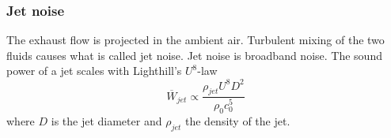 \subsubsection{Jet noise }
The exhaust flow is projected in the ambient air. Turbulent mixing of the two
fluids causes what is called jet noise. Jet noise is broadband noise.
The sound power of a jet scales with Lighthill's $U^8$-law
\begin{equation}
  \overline{W}_{jet} \propto \frac{\rho_{jet} U^8 D^2}{ \rho_0 c_0^5}
\end{equation}
where $D$ is the jet diameter and $\rho_{jet}$ the density of the jet.





%
%
%
%
%
%
%
%
